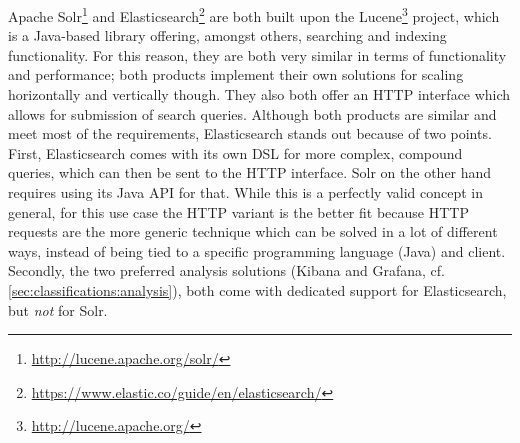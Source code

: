 \begin{table}[t]
\centering
\caption[Classification of data aggregation solutions]{Classification of data aggregation solutions. Support for arbitrary data structures, search capabilities, and combination of aggregations is not considered here since all solutions fulfill this requirement.}
\label{table:classifications:aggregation}
\end{table}

Apache Solr\footnote{\url{http://lucene.apache.org/solr/}} and Elasticsearch\footnote{\url{https://www.elastic.co/guide/en/elasticsearch/}} are both built upon the Lucene\footnote{\url{http://lucene.apache.org/}} project, which is a Java-based library offering, amongst others, searching and indexing functionality.
For this reason, they are both very similar in terms of functionality and performance; both products implement their own solutions for scaling horizontally and vertically though.
They also both offer an HTTP interface which allows for submission of search queries.
Although both products are similar and meet most of the requirements, Elasticsearch stands out because of two points. 
First, Elasticsearch comes with its own \ac{DSL} for more complex, compound queries, which can then be sent to the HTTP interface.
Solr on the other hand requires using its Java API for that.
While this is a perfectly valid concept in general, for this use case the HTTP variant is the better fit because HTTP requests are the more generic technique which can be solved in a lot of different ways, instead of being tied to a specific programming language (Java) and client.
Secondly, the two preferred analysis solutions (Kibana and Grafana, cf. \cref{sec:classifications:analysis}), both come with dedicated support for Elasticsearch, but \emph{not} for Solr.

